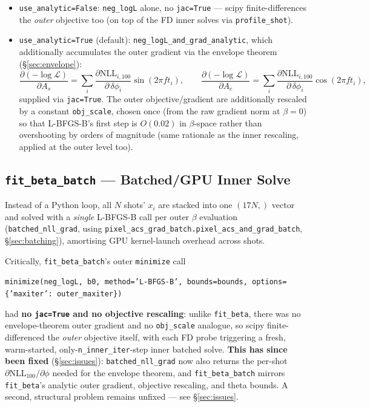 \documentclass[11pt,a4paper]{article}
\newcommand{\Lcal}{\mathcal{L}}
\newcommand{\code}[1]{\texttt{#1}}
\begin{document}
\begin{itemize}
  \item \code{use\_analytic=False}: \code{neg\_logL} alone, no
    \code{jac=True} --- scipy finite-differences the \emph{outer} objective
    too (on top of the FD inner solves via \code{profile\_shot}).
  \item \code{use\_analytic=True} (default): \code{neg\_logL\_and\_grad\_analytic},
    which additionally accumulates the outer gradient via the envelope
    theorem (\S\ref{sec:envelope}):
    \begin{equation}
      \frac{\partial(-\log\Lcal)}{\partial A_s}
      = \sum_i \frac{\partial \mathrm{NLL}_{i,100}}{\partial\,\delta\phi_i}
        \sin(2\pi f t_i),
      \qquad
      \frac{\partial(-\log\Lcal)}{\partial A_c}
      = \sum_i \frac{\partial \mathrm{NLL}_{i,100}}{\partial\,\delta\phi_i}
        \cos(2\pi f t_i),
    \end{equation}
    supplied via \code{jac=True}. The outer objective/gradient are
    additionally rescaled by a constant \code{obj\_scale}, chosen once
    (from the raw gradient norm at $\beta=0$) so that L-BFGS-B's first
    step is $O(0.02)$ in $\beta$-space rather than overshooting by orders
    of magnitude (same rationale as the inner rescaling, applied at the
    outer level too).
\end{itemize}

\subsection{\code{fit\_beta\_batch} --- Batched/GPU Inner Solve}
\label{sec:outer_batch}

Instead of a Python loop, all $N$ shots' $x_i$ are stacked into one
$(17N,)$ vector and solved with a \emph{single} L-BFGS-B call per outer
$\beta$ evaluation (\code{batched\_nll\_grad}, using
\code{pixel\_acs\_grad\_batch.pixel\_acs\_and\_grad\_batch},
\S\ref{sec:batching}), amortising GPU kernel-launch overhead across shots.

Critically, \code{fit\_beta\_batch}'s outer \code{minimize} call
\begin{center}
  \code{minimize(neg\_logL, b0, method='L-BFGS-B', bounds=bounds,
  options=\{'maxiter': outer\_maxiter\})}
\end{center}
had \textbf{no \code{jac=True} and no objective rescaling}: unlike
\code{fit\_beta}, there was no envelope-theorem outer gradient and no
\code{obj\_scale} analogue, so scipy finite-differenced the \emph{outer}
objective itself, with each FD probe triggering a fresh, warm-started,
only-\code{n\_inner\_iter}-step inner batched solve. \textbf{This has since
been fixed} (\S\ref{sec:issues}): \code{batched\_nll\_grad} now also
returns the per-shot $\partial\mathrm{NLL}_{100}/\partial\phi$ needed for
the envelope theorem, and \code{fit\_beta\_batch} mirrors
\code{fit\_beta}'s analytic outer gradient, objective rescaling, and theta
bounds. A second, structural problem remains unfixed --- see
\S\ref{sec:issues}.
\end{document}
